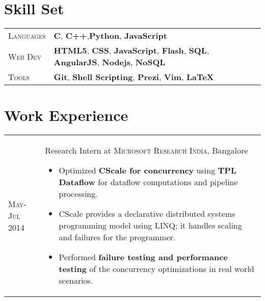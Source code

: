 \documentclass[a4paper,10pt]{article} %
\begin{document}
\section{Skill Set}

\begin{tabular}{>{\raggedleft}p{2.2cm}p{15cm}}

    \textsc{Languages} %
            & \textbf{C}, \textbf{C++},\textbf{Python}, \textbf{JavaScript} \\
    \textsc{Web Dev} %
            & \textbf{HTML5}, \textbf{CSS}, \textbf{JavaScript}, \textbf{Flash}, \textbf{SQL},
              \textbf{AngularJS}, \textbf{Nodejs}, \textbf{NoSQL}\\
    \textsc{Tools} %
            & \textbf{Git}, \textbf{Shell Scripting}, \textbf{Prezi}, \textbf{Vim}, \textbf{LaTeX}\\

\end{tabular}


\section{Work Experience}

\begin{tabular}{>{\raggedleft}p{2.2cm}|p{15cm}}
    \textsc{May-Jul 2014} & Research Intern at \textsc{Microsoft Research India}, Bangalore
                            \footnotesize{
                                \begin{itemize}[leftmargin=*]
                                    \item Optimized \textbf{CScale for concurrency} using \textbf{TPL Dataflow}
                                        for dataflow computations and pipeline processing.
                                    \item CScale provides a declarative distributed systems programming
                                        model using LINQ; it handles scaling and failures for the programmer.
                                    \item Performed \textbf{failure testing and performance testing}
                                        of the concurrency optimizations in real world scenarios.
                                \end{itemize}
                            }
\end{tabular}
\end{document}
